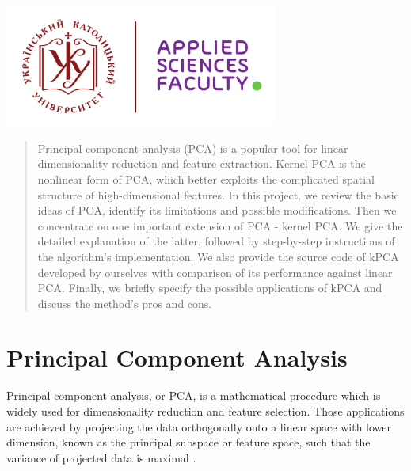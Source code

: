 \begin{titlepage}

\includegraphics[height=4cm]{img/UCU-Apps.png}\\[1cm] %
 

\vfill %

\end{titlepage}


\begin{abstract}
Principal component analysis (PCA) is a
popular tool for linear dimensionality reduction
and feature extraction. Kernel PCA
is the nonlinear form of PCA, which better
exploits the complicated spatial structure of
high-dimensional features. In this project, we review the basic ideas of PCA, identify its limitations and possible modifications. Then we concentrate on one important extension of PCA - kernel
PCA. We give the detailed explanation of the latter, followed by step-by-step instructions of the algorithm's implementation.  We also provide the source code of kPCA developed by ourselves with comparison of its performance against linear PCA. Finally, we briefly specify the possible applications of kPCA and discuss the method's pros and cons.
\end{abstract}

\section{Principal Component Analysis}
Principal component analysis, or PCA, is a mathematical procedure which is widely used for dimensionality reduction and feature selection. Those applications are achieved by projecting the data orthogonally onto a linear space with lower dimension, known as the principal subspace or feature space, such that the variance of projected data is maximal \citep*{bishop}.

